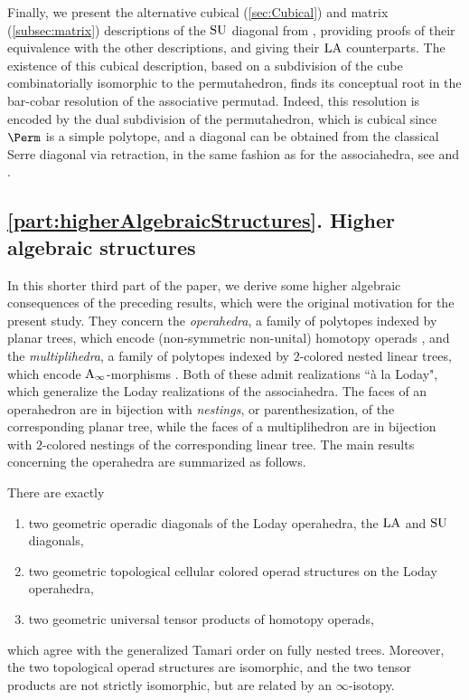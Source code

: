 Finally, we present the alternative cubical (\cref{sec:Cubical}) and matrix (\cref{subsec:matrix}) descriptions of the $\mathrm{SU}$ diagonal from \cite{SaneblidzeUmble,SaneblidzeUmble-comparingDiagonals}, providing proofs of their equivalence with the other descriptions, and giving their $\mathrm{LA}$ counterparts. 
The existence of this cubical description, based on a subdivision of the cube combinatorially isomorphic to the permutahedron, finds its conceptual root in the bar-cobar resolution of the associative permutad. 
Indeed, this resolution is encoded by the dual subdivision of the permutahedron, which is cubical since $\Perm$ is a simple polytope, and a diagonal can be obtained from the classical Serre diagonal via retraction, in the same fashion as for the associahedra, see \cite{MarklShnider, Loday-diagonal} and \cite[Sec. 5.1]{LaplanteAnfossiMazuir}.


\subsection*{\cref{part:higherAlgebraicStructures}. Higher algebraic structures}

In this shorter third part of the paper, we derive some higher algebraic consequences of the preceding results, which were the original motivation for the present study.
They concern the \emph{operahedra}, a family of polytopes indexed by planar trees, which encode (non-symmetric non-unital) homotopy operads \cite{LaplanteAnfossi}, and the \emph{multiplihedra}, a family of polytopes indexed by $2$-colored nested linear trees, which encode $\mathrm{A}_\infty$-morphisms \cite{LaplanteAnfossiMazuir}.
Both of these admit realizations ``\`a la Loday", which generalize the Loday realizations of the associahedra. 
The faces of an operahedron are in bijection with \emph{nestings}, or parenthesization, of the corresponding planar tree, while the faces of a multiplihedron are in bijection with $2$-colored nestings of the corresponding linear tree. 
The main results concerning the operahedra are summarized as follows. 

\begin{theorem*} 
There are exactly 
\begin{enumerate}
	\item two geometric operadic diagonals of the Loday operahedra, the $\mathrm{LA}$ and $\mathrm{SU}$ diagonals, 
	\item two geometric topological cellular colored operad structures on the Loday operahedra,
	\item two geometric universal tensor products of homotopy operads,
\end{enumerate}
which agree with the generalized Tamari order on fully nested trees. 
Moreover, the two topological operad structures are isomorphic, and the two tensor products are not strictly isomorphic, but are related by an $\infty$-isotopy. 
\end{theorem*}

